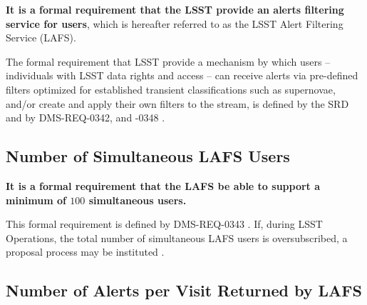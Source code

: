 \documentclass[DM,authoryear,toc]{lsstdoc}
\begin{document}
{\bf It is a formal requirement that the LSST provide an alerts filtering service for users}, which is hereafter referred to as the LSST Alert Filtering Service (LAFS).

The formal requirement that LSST provide a mechanism by which users -- individuals with LSST data rights and access -- can receive alerts via pre-defined filters optimized for established transient classifications such as supernovae, and/or create and apply their own filters to the stream, is defined by the SRD  and by DMS-REQ-0342, and -0348 . 



\subsection{Number of Simultaneous LAFS Users}\label{ssec:LAFS_users}

{\bf It is a formal requirement that the LAFS be able to support a minimum of $100$ simultaneous users.}

This formal requirement is defined by DMS-REQ-0343 . If, during LSST Operations, the total number of simultaneous LAFS users is oversubscribed, a proposal process may be instituted .



\subsection{Number of Alerts per Visit Returned by LAFS}\label{ssec:LAFS_returns}
\end{document}
